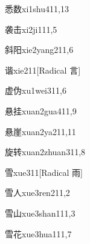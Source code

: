\begin{verbete}{悉数}{xi1shu4}{11,13}
\end{verbete}

\begin{verbete}{袭击}{xi2ji1}{11,5}
\end{verbete}

\begin{verbete}{斜阳}{xie2yang2}{11,6}
\end{verbete}

\begin{verbete}{谐}{xie2}{11}[Radical 言]
\end{verbete}

\begin{verbete}{虚伪}{xu1wei3}{11,6}
\end{verbete}

\begin{verbete}{悬挂}{xuan2gua4}{11,9}
\end{verbete}

\begin{verbete}{悬崖}{xuan2ya2}{11,11}
\end{verbete}

\begin{verbete}{旋转}{xuan2zhuan3}{11,8}
\end{verbete}

\begin{verbete}{雪}{xue3}{11}[Radical 雨]
\end{verbete}

\begin{verbete}{雪人}{xue3ren2}{11,2}
\end{verbete}

\begin{verbete}{雪山}{xue3shan1}{11,3}
\end{verbete}

\begin{verbete}{雪花}{xue3hua1}{11,7}
\end{verbete}

